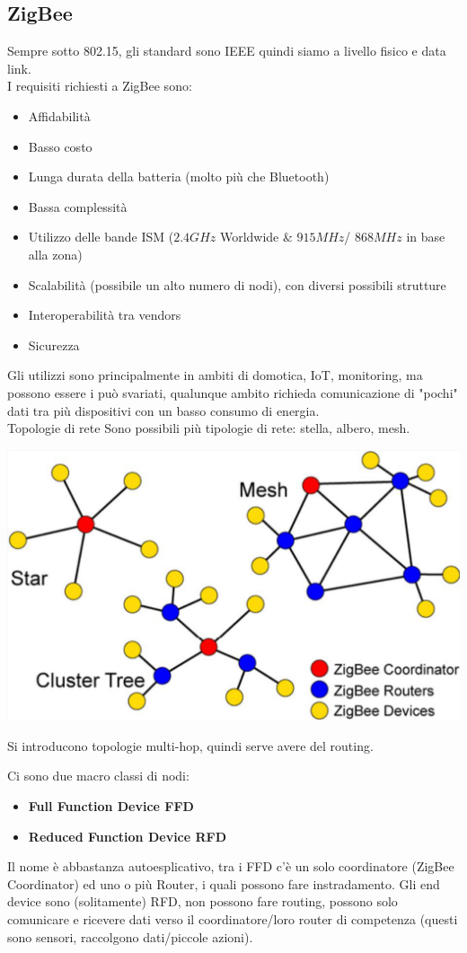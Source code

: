 

\subsection{ZigBee}
Sempre sotto 802.15, gli standard sono IEEE quindi siamo a livello fisico e data link.\\

I requisiti richiesti a ZigBee sono: 
\begin{itemize}
	\item Affidabilità
	\item Basso costo
	\item Lunga durata della batteria (molto più che Bluetooth)
	\item Bassa complessità
	\item Utilizzo delle bande ISM ($2.4GHz$ Worldwide \& $915 MHz$/ $868MHz$ in base alla zona)
	\item Scalabilità (possibile un alto numero di nodi), con diversi possibili strutture
	\item Interoperabilità tra vendors
	\item Sicurezza
\end{itemize}

Gli utilizzi sono principalmente in ambiti di domotica, IoT, monitoring, ma possono essere i può svariati, qualunque ambito richieda comunicazione di "pochi" dati tra più dispositivi con un basso consumo di energia.\\

Topologie di rete
Sono possibili più tipologie di rete: stella, albero, mesh.
\begin{center}
	\includegraphics[width=0.5\linewidth]{img/wpan/ztopology}
\end{center}

Si introducono topologie multi-hop, quindi serve avere del routing.\\

\newpage

Ci sono due macro classi di nodi: 
\begin{itemize}
	\item \textbf{Full Function Device FFD}
	\item \textbf{Reduced Function Device RFD}
\end{itemize}
Il nome è abbastanza autoesplicativo, tra i FFD c'è un solo coordinatore (ZigBee Coordinator) ed uno o più Router, i quali possono fare instradamento. Gli end device sono (solitamente) RFD, non possono fare routing, possono solo comunicare e ricevere dati verso il coordinatore/loro router di competenza (questi sono sensori, raccolgono dati/piccole azioni).\\

